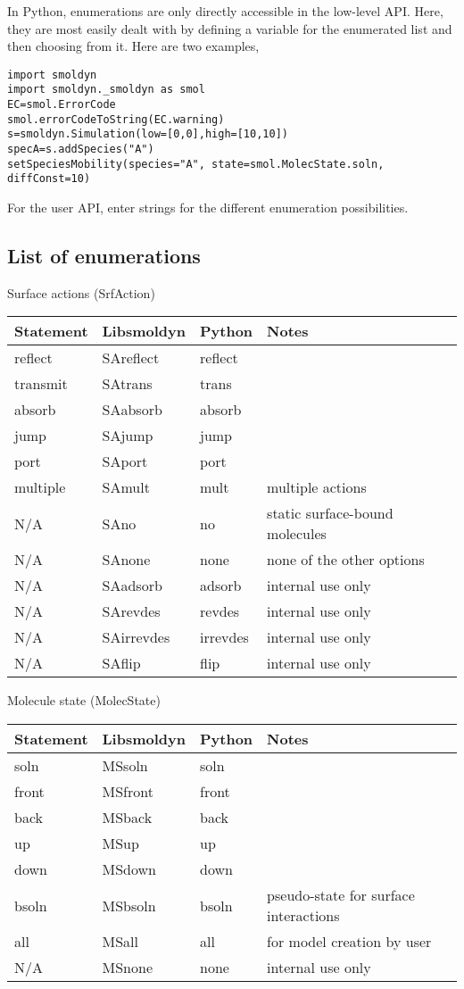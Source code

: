 \documentclass {scrbook}
\begin{document}
In Python, enumerations are only directly accessible in the low-level API. Here, they are most easily dealt with by defining a variable for the enumerated list and then choosing from it. Here are two examples,
\begin{lstlisting}[style=SSAC]
import smoldyn
import smoldyn._smoldyn as smol
EC=smol.ErrorCode
smol.errorCodeToString(EC.warning)
s=smoldyn.Simulation(low=[0,0],high=[10,10])
specA=s.addSpecies("A")
setSpeciesMobility(species="A", state=smol.MolecState.soln, diffConst=10)
\end{lstlisting}
For the user API, enter strings for the different enumeration possibilities.

\subsection*{List of enumerations}

Surface actions (SrfAction)
\begin{longtable}[c]{llll}
Statement & Libsmoldyn & Python & Notes\\
\hline
reflect & SAreflect & reflect\\
transmit & SAtrans & trans\\
absorb & SAabsorb & absorb\\
jump & SAjump & jump\\
port & SAport & port\\
multiple & SAmult & mult & multiple actions\\
N/A & SAno & no & static surface-bound molecules\\
N/A & SAnone & none & none of the other options\\
N/A & SAadsorb & adsorb & internal use only\\
N/A & SArevdes & revdes & internal use only\\
N/A & SAirrevdes & irrevdes & internal use only\\
N/A & SAflip & flip & internal use only
\end{longtable}

Molecule state (MolecState)
\begin{longtable}[c]{llll}
Statement & Libsmoldyn & Python & Notes\\
\hline
soln & MSsoln & soln\\
front & MSfront & front\\
back & MSback & back\\
up & MSup & up\\
down & MSdown & down\\
bsoln & MSbsoln & bsoln & pseudo-state for surface interactions\\
all & MSall & all & for model creation by user\\
N/A & MSnone & none & internal use only
\end{longtable}
\end{document}
